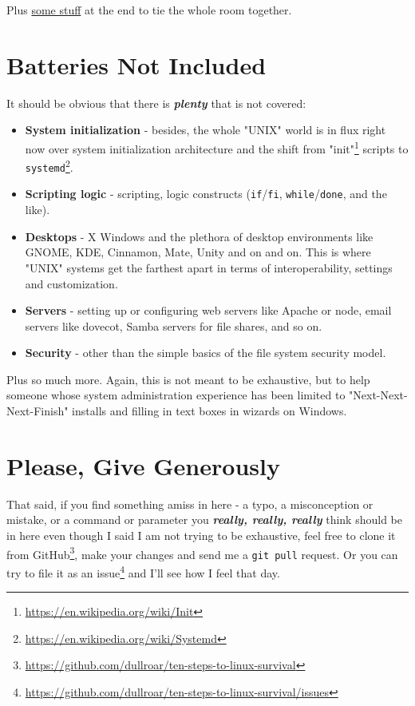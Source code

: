 \documentclass[10pt,]{book}
\renewcommand{\href}[2]{#2\footnote{\url{#1}}}
\numberwithin{figure}{chapter}
\begin{document}
Plus \hyperref[appendices]{some stuff} at the end to tie the whole room
together.

\section*{Batteries Not Included}\label{batteries-not-included}

It should be obvious that there is \textbf{\emph{plenty}} that is not
covered:

\begin{itemize}
\item
  \textbf{System initialization} - besides, the whole "UNIX" world is in
  flux right now over system initialization architecture and the shift
  from \href{https://en.wikipedia.org/wiki/Init}{"init"} scripts to
  \href{https://en.wikipedia.org/wiki/Systemd}{\texttt{systemd}}.
\item
  \textbf{Scripting logic} - scripting, logic constructs
  (\texttt{if}/\texttt{fi}, \texttt{while}/\texttt{done}, and the like).
\item
  \textbf{Desktops} - X Windows and the plethora of desktop environments
  like GNOME, KDE, Cinnamon, Mate, Unity and on and on. This is where
  "UNIX" systems get the farthest apart in terms of interoperability,
  settings and customization.
\item
  \textbf{Servers} - setting up or configuring web servers like Apache
  or node, email servers like dovecot, Samba servers for file shares,
  and so on.
\item
  \textbf{Security} - other than the simple basics of the file system
  security model.
\end{itemize}

Plus so much more. Again, this is not meant to be exhaustive, but to
help someone whose system administration experience has been limited to
"Next-Next-Next-Finish" installs and filling in text boxes in wizards on
Windows.

\section*{Please, Give Generously}\label{please-give-generously}

That said, if you find something amiss in here - a typo, a misconception
or mistake, or a command or parameter you \textbf{\emph{really, really,
really}} think should be in here even though I said I am not trying to
be exhaustive, feel free to
\href{https://github.com/dullroar/ten-steps-to-linux-survival}{clone it
from GitHub}, make your changes and send me a \texttt{git pull} request.
Or you can try to
\href{https://github.com/dullroar/ten-steps-to-linux-survival/issues}{file
it as an issue} and I'll see how I feel that day.
\end{document}
